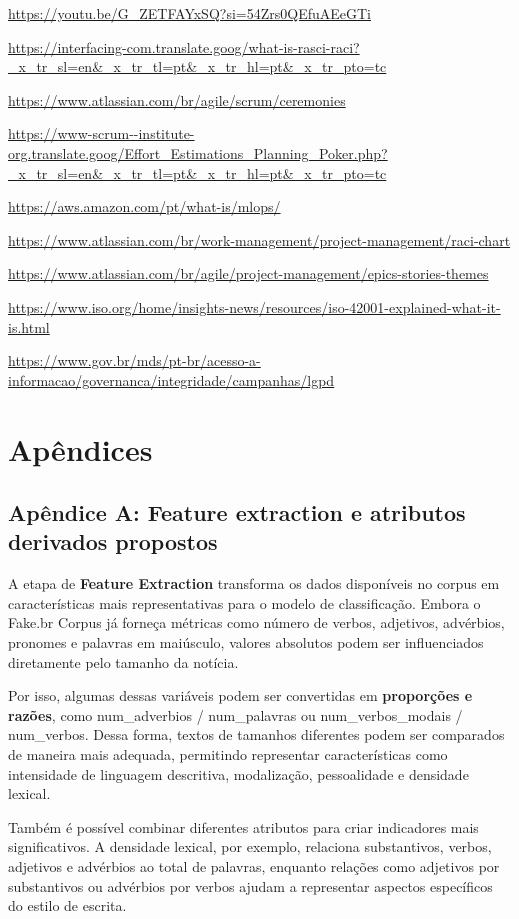 \documentclass[
  brazilian,
  11pt,
]{article}
\begin{document}
\url{https://youtu.be/G_ZETFAYxSQ?si=54Zrs0QEfuAEeGTi}

\url{https://interfacing-com.translate.goog/what-is-rasci-raci?_x_tr_sl=en&_x_tr_tl=pt&_x_tr_hl=pt&_x_tr_pto=tc}

\url{https://www.atlassian.com/br/agile/scrum/ceremonies}

\url{https://www-scrum--institute-org.translate.goog/Effort_Estimations_Planning_Poker.php?_x_tr_sl=en&_x_tr_tl=pt&_x_tr_hl=pt&_x_tr_pto=tc}

\url{https://aws.amazon.com/pt/what-is/mlops/}

\url{https://www.atlassian.com/br/work-management/project-management/raci-chart}

\url{https://www.atlassian.com/br/agile/project-management/epics-stories-themes}

\url{https://www.iso.org/home/insights-news/resources/iso-42001-explained-what-it-is.html}

\url{https://www.gov.br/mds/pt-br/acesso-a-informacao/governanca/integridade/campanhas/lgpd}

\section{Apêndices}\label{apuxeandices}

\subsection{Apêndice A: Feature extraction e atributos derivados propostos}\label{apuxeandice-a-feature-extraction-e-atributos-derivados-propostos}

A etapa de \textbf{Feature Extraction} transforma os dados disponíveis no corpus em características mais representativas para o modelo de classificação. Embora o Fake.br Corpus já forneça métricas como número de verbos, adjetivos, advérbios, pronomes e palavras em maiúsculo, valores absolutos podem ser influenciados diretamente pelo tamanho da notícia.

Por isso, algumas dessas variáveis podem ser convertidas em \textbf{proporções e razões}, como num\_adverbios / num\_palavras ou num\_verbos\_modais / num\_verbos. Dessa forma, textos de tamanhos diferentes podem ser comparados de maneira mais adequada, permitindo representar características como intensidade de linguagem descritiva, modalização, pessoalidade e densidade lexical.

Também é possível combinar diferentes atributos para criar indicadores mais significativos. A densidade lexical, por exemplo, relaciona substantivos, verbos, adjetivos e advérbios ao total de palavras, enquanto relações como adjetivos por substantivos ou advérbios por verbos ajudam a representar aspectos específicos do estilo de escrita.
\end{document}
